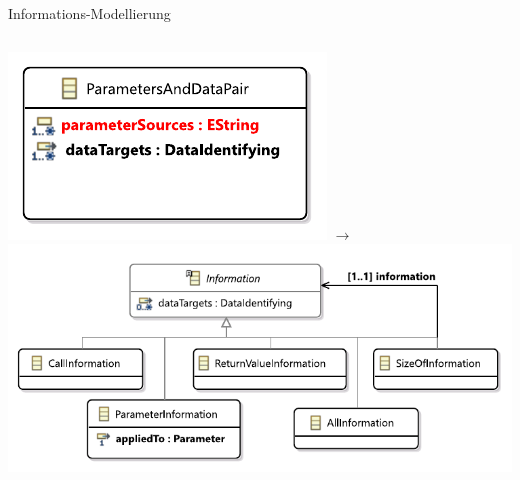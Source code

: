 \documentclass{sdqbeamer}
\begin{document}
\begin{frame}{Informations-Modellierung}
	\begin{columns}
		\centering
		\includegraphics[width=\textwidth]{images/ParameterAndDataPair.pdf}
		\centering
		$\rightarrow$
		\centering
		\includegraphics[width=\textwidth]{images/information.pdf}
	\end{columns}
\end{frame}
\end{document}
